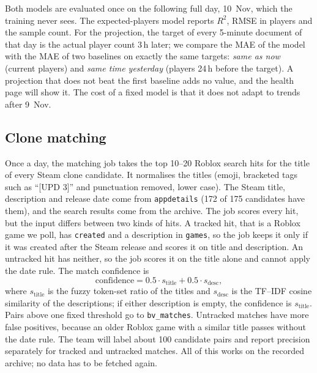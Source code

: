 \documentclass[10pt,a4paper]{article}
\newcommand{\ep}[1]{\texttt{\small #1}}
\begin{document}
Both models are evaluated once on the following full day, 10~Nov, which the training never sees. The expected-players model reports $R^2$, RMSE in players and the sample count. For the projection, the target of every 5-minute document of that day is the actual player count 3\,h later; we compare the MAE of the model with the MAE of two baselines on exactly the same targets: \emph{same as now} (current players) and \emph{same time yesterday} (players 24\,h before the target). A projection that does not beat the first baseline adds no value, and the health page will show it. The cost of a fixed model is that it does not adapt to trends after 9~Nov.

\subsection{Clone matching}\label{sec:matching}
Once a day, the matching job takes the top 10--20 Roblox search hits for the title of every Steam clone candidate. It normalises the titles (emoji, bracketed tags such as ``[UPD 3]'' and punctuation removed, lower case). The Steam title, description and release date come from \ep{appdetails} (172 of 175 candidates have them), and the search results come from the archive. The job scores every hit, but the input differs between two kinds of hits. A tracked hit, that is a Roblox game we poll, has \ep{created} and a description in \ep{games}, so the job keeps it only if it was created after the Steam release and scores it on title and description. An untracked hit has neither, so the job scores it on the title alone and cannot apply the date rule. The match confidence is
\[
\text{confidence} = 0.5 \cdot s_{\text{title}} + 0.5 \cdot s_{\text{desc}},
\]
where $s_{\text{title}}$ is the fuzzy token-set ratio of the titles and $s_{\text{desc}}$ is the TF--IDF cosine similarity of the descriptions; if either description is empty, the confidence is $s_{\text{title}}$. Pairs above one fixed threshold go to \ep{bv\_matches}. Untracked matches have more false positives, because an older Roblox game with a similar title passes without the date rule. The team will label about 100 candidate pairs and report precision separately for tracked and untracked matches. All of this works on the recorded archive; no data has to be fetched again.
\end{document}
